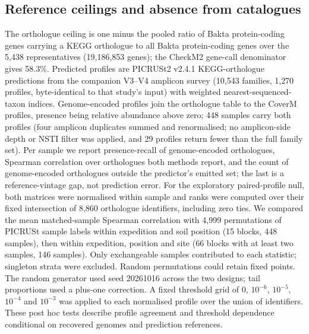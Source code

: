 \documentclass[11pt]{article}
\begin{document}
\subsection*{Reference ceilings and absence from catalogues}
The orthologue ceiling is one minus the pooled ratio of Bakta protein-coding genes carrying a KEGG
orthologue to all Bakta protein-coding genes over the 5{,}438 representatives (19{,}186{,}853 genes);
the CheckM2 gene-call denominator gives 58.3\%. Predicted profiles are PICRUSt2 v2.4.1
\citep{douglas2020picrust2} KEGG-orthologue predictions from the companion V3--V4 amplicon survey
(10{,}543 families, 1{,}270 profiles, byte-identical to that study's input) with weighted
nearest-sequenced-taxon indices. Genome-encoded profiles join the orthologue table to the CoverM
profiles, presence being relative abundance above zero; 448 samples carry both profiles (four
amplicon duplicates summed and renormalised; no amplicon-side depth or NSTI filter was applied, and
29 profiles return fewer than the full family set). Per sample we report presence-recall of
genome-encoded orthologues, Spearman correlation over orthologues both methods report, and the count
of genome-encoded orthologues outside the predictor's emitted set; the last is a reference-vintage
gap, not prediction error.
For the exploratory paired-profile null, both matrices were normalised within sample and ranks were computed over their fixed intersection of 8{,}860 orthologue identifiers, including zero ties. We compared the mean matched-sample Spearman correlation with 4{,}999 permutations of PICRUSt sample labels within expedition and soil position (15 blocks, 448 samples), then within expedition, position and site (66 blocks with at least two samples, 146 samples). Only exchangeable samples contributed to each statistic; singleton strata were excluded. Random permutations could retain fixed points. The random generator used seed 20261016 across the two designs; tail proportions used a plus-one correction. A fixed threshold grid of $0$, $10^{-6}$, $10^{-5}$, $10^{-4}$ and $10^{-3}$ was applied to each normalised profile over the union of identifiers. These post hoc tests describe profile agreement and threshold dependence conditional on recovered genomes and prediction references.
\end{document}
